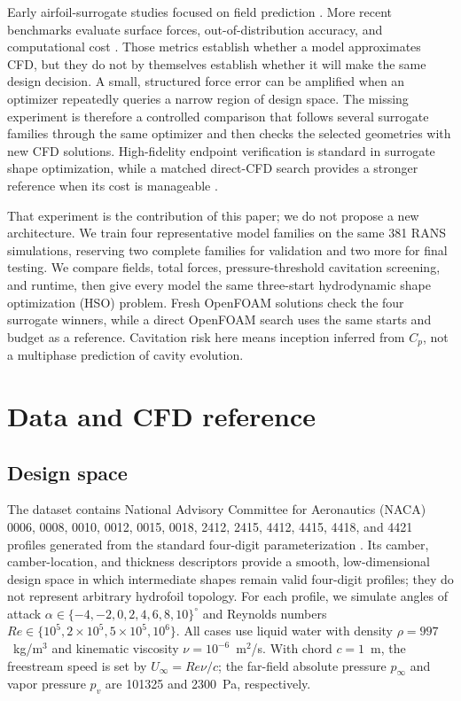 \documentclass{article}
\begin{document}
Early airfoil-surrogate studies focused on field prediction
\citep{guo2016steady,bhatnagar2019aerodynamic,sekar2019airfoils,thuerey2020rans}.
More recent benchmarks evaluate surface forces, out-of-distribution accuracy,
and computational cost \citep{bonnet2022airfrans,li2023gino,yagoubi2025ml4cfd}.
Those metrics establish whether a model approximates CFD, but they do not by
themselves establish whether it will make the same design decision. A small,
structured force error can be amplified when an optimizer repeatedly queries a
narrow region of design space. The missing experiment is therefore a
controlled comparison that follows several surrogate families through the
same optimizer and then checks the selected geometries with new CFD solutions.
High-fidelity endpoint verification is standard in surrogate shape optimization, while a
matched direct-CFD search provides a stronger reference when its cost is
manageable \citep{li2022mlaso,shukla2023operators}.

That experiment is the contribution of this paper; we do not propose a new
architecture. We train four representative model families on the same 381 RANS
simulations, reserving two complete families for validation and two more for final
testing. We compare
fields, total forces, pressure-threshold cavitation screening, and runtime, then
give every model the same three-start hydrodynamic shape optimization (HSO)
problem. Fresh OpenFOAM solutions
check the four surrogate winners, while a direct OpenFOAM search uses the same
starts and budget as a reference. Cavitation risk here means inception inferred
from $C_p$, not a multiphase prediction of cavity evolution.

\section{Data and CFD reference}
\subsection{Design space}
The dataset contains National Advisory Committee for Aeronautics (NACA) 0006, 0008, 0010, 0012, 0015, 0018, 2412, 2415, 4412, 4415, 4418, and 4421 profiles generated from the standard four-digit parameterization \citep{abbott1959airfoils}. Its camber, camber-location, and thickness descriptors provide a smooth, low-dimensional design space in which intermediate shapes remain valid four-digit profiles; they do not represent arbitrary hydrofoil topology. For each profile, we simulate angles of attack $\alpha\in\{-4,-2,0,2,4,6,8,10\}^{\circ}$ and Reynolds numbers $Re\in\{10^5,2\times10^5,5\times10^5,10^6\}$. All cases use liquid water with density $\rho=997$~kg/m$^3$ and kinematic viscosity $\nu=10^{-6}$~m$^2$/s. With chord $c=1$~m, the freestream speed is set by $U_\infty=Re\nu/c$; the far-field absolute pressure $p_\infty$ and vapor pressure $p_v$ are 101325 and 2300~Pa, respectively.
\end{document}
